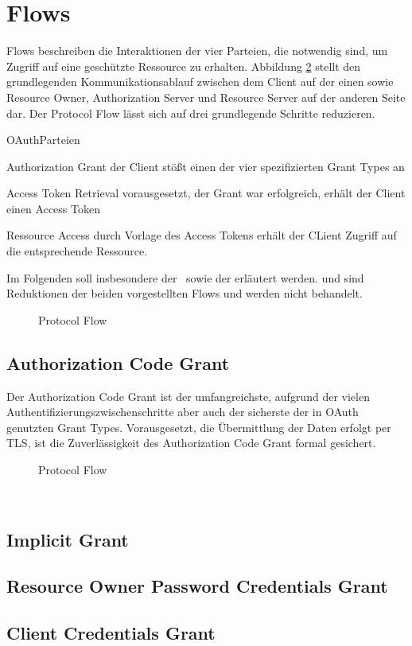 \section{Flows}\label{Flows} Flows beschreiben die Interaktionen der vier
Parteien, die notwendig sind, um Zugriff auf eine geschützte Ressource zu
erhalten. Abbildung \ref{fig: Protocol Flow} stellt den grundlegenden
Kommunikationsablauf zwischen dem Client auf der einen sowie Resource Owner,
Authorization Server und Resource Server auf der anderen Seite dar. Der Protocol
Flow lässt sich auf drei grundlegende Schritte reduzieren.

\begin{labeling}{OAuthParteien}
    \item [Authorization Grant] der Client stößt einen der vier spezifizierten \glspl{Grant Type} an
    \item [Access Token Retrieval] vorausgesetzt, der Grant war erfolgreich, erhält der Client einen Access Token
    \item [Ressource Access] durch Vorlage des Access Tokens erhält der CLient Zugriff auf die entsprechende Ressource.
\end{labeling}


Im Folgenden soll insbesondere der~ sowie der
 erläutert werden.  und
 sind Reduktionen der beiden vorgestellten Flows und
werden nicht behandelt.

\begin{figure}[h]
    
    \caption{Protocol Flow}\label{fig: Protocol Flow}
\end{figure}

\subsection{Authorization Code Grant}\label{ssec:authcode}
Der Authorization Code Grant ist der umfangreichste, aufgrund der vielen
Authentifizierungszwischenschritte aber auch der sicherste der in \gls{OAuth}
genutzten \glspl{Grant Type}. Vorausgesetzt, die Übermittlung der Daten erfolgt
per \gls{TLS}, ist die Zuverlässigkeit des Authorization Code Grant formal gesichert.

\begin{figure}[h]
    
    \caption{Protocol Flow}\label{fig: Protocol Flow}
\end{figure}

~\cite{Chari.2011}
\subsection{Implicit Grant}\label{ssec:implicit}
\subsection{Resource Owner Password Credentials Grant}\label{ssec:passwordcred}
\subsection{Client Credentials Grant}\label{ssec:clientcred}


\blindtext{}
